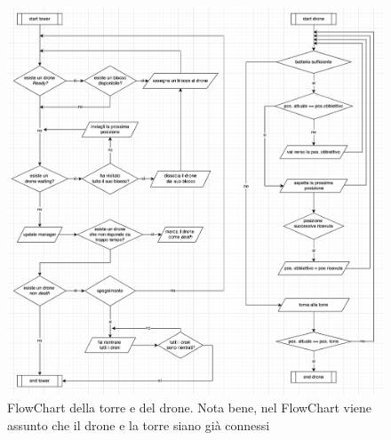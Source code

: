 \documentclass[a4paper, 11pt]{article}
\begin{document}
\begin{figure}[H]
    \centering
    \includegraphics[height = 16 cm]{image/FlowCharts.png}
    \caption{FlowChart della torre e del drone. Nota bene, nel FlowChart viene assunto che il drone e la torre siano già connessi}
    
\end{figure}
\end{document}
